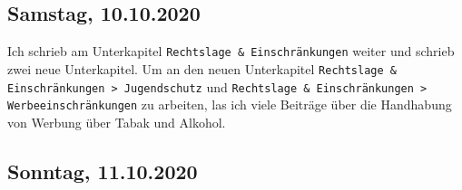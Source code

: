 \documentclass[../main.tex]{subfiles}
\begin{document}
	
	\subsection{Samstag, 10.10.2020}
	Ich schrieb am Unterkapitel \texttt{Rechtslage \& Einschränkungen} weiter und schrieb zwei neue Unterkapitel.
	Um an den neuen Unterkapitel \texttt{Rechtslage \& Einschränkungen > Jugendschutz} und \texttt{Rechtslage \& Einschränkungen > Werbeeinschränkungen} zu arbeiten, las ich viele Beiträge über die Handhabung von Werbung über Tabak und Alkohol. 
	 
	
	
	\subsection{Sonntag, 11.10.2020}
	
\end{document}
